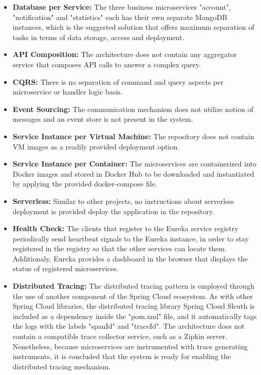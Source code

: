 \documentclass{Configuration_Files/PoliMi3i_thesis}
\begin{document}
\begin{itemize}
    \item \textbf{Database per Service:} The three business microservices "account", "notification" and "statistics" each has their own separate MongoDB instances, which is the suggested solution that offers maximum separation of tasks in terms of data storage, access and deployment.
    
    \item \textbf{API Composition:} The architecture does not contain any aggregator service that composes API calls to answer a complex query.
    
    \item \textbf{CQRS:} There is no separation of command and query aspects per microservice or handler logic basis.
    
    \item \textbf{Event Sourcing:} The communication mechanism does not utilize notion of messages and an event store is not present in the system.
    
    \item \textbf{Service Instance per Virtual Machine:} The repository does not contain VM images as a readily provided deployment option.
    
    \item \textbf{Service Instance per Container:} The microservices are containerized into Docker images and stored in Docker Hub to be downloaded and instantiated by applying the provided docker-compose file.
    
    \item \textbf{Serverless:} Similar to other projects, no instructions about serverless deployment is provided deploy the application in the repository.
    
    \item \textbf{Health Check:} The clients that register to the Eureka service registry periodically send heartbeat signals to the Eureka instance, in order to stay registered in the registry so that the other services can locate them.
    Additionaly, Eureka provides a dashboard in the browser that displays the status of registered microservices.
    
    \item \textbf{Distributed Tracing:} The distributed tracing pattern is employed through the use of another component of the Spring Cloud ecosystem.
    As with other Spring Cloud libraries, the distributed tracing library Spring Cloud Sleuth is included as a dependency inside the "pom.xml" file, and it automatically tags the logs with the labels "spanId" and "traceId".
    The architecture does not contain a compatible trace collector service, such as a Zipkin server.
    Nonetheless, because microservices are instrumented with trace generating instruments, it is concluded that the system is ready for enabling the distributed tracing mechanism.
    

\end{itemize}
\end{document}
